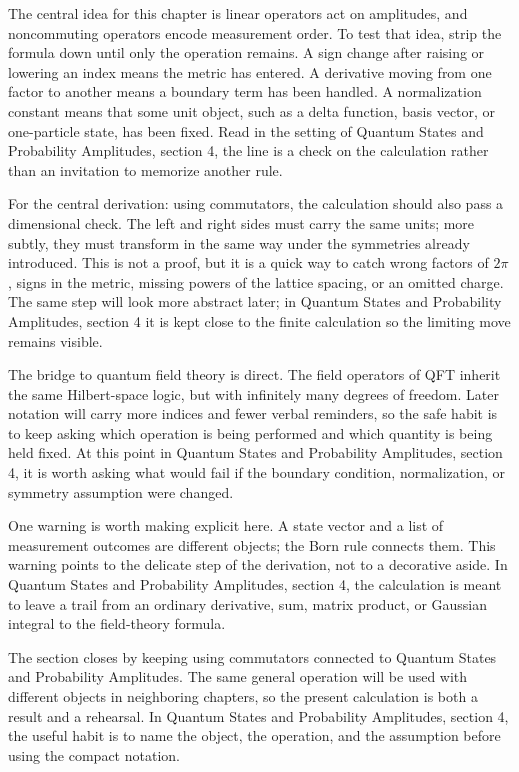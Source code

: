 The central idea for this chapter is linear operators act on amplitudes, and noncommuting operators encode measurement order.  To test that idea, strip the formula down until only the operation remains.  A sign change after raising or lowering an index means the metric has entered.  A derivative moving from one factor to another means a boundary term has been handled.  A normalization constant means that some unit object, such as a delta function, basis vector, or one-particle state, has been fixed.  Read in the setting of Quantum States and Probability Amplitudes, section 4, the line is a check on the calculation rather than an invitation to memorize another rule.

For the central derivation: using commutators, the calculation should also pass a dimensional check.  The left and right sides must carry the same units; more subtly, they must transform in the same way under the symmetries already introduced.  This is not a proof, but it is a quick way to catch wrong factors of \(2\pi\), signs in the metric, missing powers of the lattice spacing, or an omitted charge.  The same step will look more abstract later; in Quantum States and Probability Amplitudes, section 4 it is kept close to the finite calculation so the limiting move remains visible.

The bridge to quantum field theory is direct.  The field operators of QFT inherit the same Hilbert-space logic, but with infinitely many degrees of freedom.  Later notation will carry more indices and fewer verbal reminders, so the safe habit is to keep asking which operation is being performed and which quantity is being held fixed.  At this point in Quantum States and Probability Amplitudes, section 4, it is worth asking what would fail if the boundary condition, normalization, or symmetry assumption were changed.

One warning is worth making explicit here.  A state vector and a list of measurement outcomes are different objects; the Born rule connects them.  This warning points to the delicate step of the derivation, not to a decorative aside.  In Quantum States and Probability Amplitudes, section 4, the calculation is meant to leave a trail from an ordinary derivative, sum, matrix product, or Gaussian integral to the field-theory formula.

The section closes by keeping using commutators connected to Quantum States and Probability Amplitudes.  The same general operation will be used with different objects in neighboring chapters, so the present calculation is both a result and a rehearsal.  In Quantum States and Probability Amplitudes, section 4, the useful habit is to name the object, the operation, and the assumption before using the compact notation.



